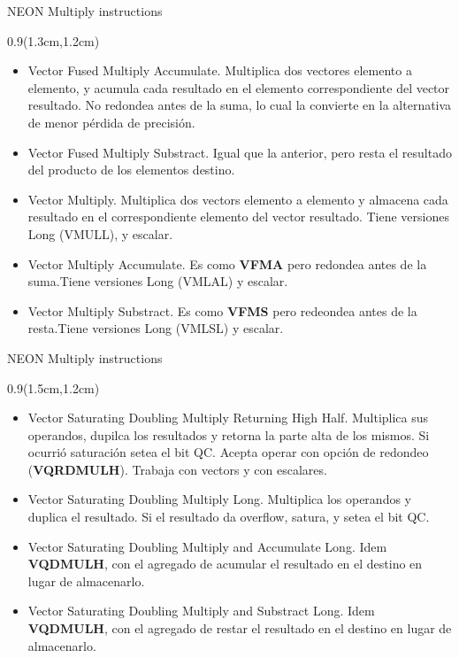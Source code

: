 \begin{frame}{NEON Multiply instructions}
 \begin{textblock*}{0.9\textwidth}(1.3cm,1.2cm)
  \begin{itemize}\justifying
   \item [VFMA] Vector Fused Multiply Accumulate. Multiplica dos vectores elemento a elemento, y acumula cada resultado en el elemento correspondiente del vector resultado. No redondea antes de la suma, lo cual la convierte en la alternativa de menor pérdida de precisión.
   \item [VFMS] Vector Fused Multiply Substract. Igual que la anterior, pero resta el resultado del producto de los elementos destino.
   \item [VMUL] Vector Multiply. Multiplica dos vectors elemento a elemento y almacena cada resultado en el correspondiente elemento del vector resultado. Tiene versiones Long ({\color{blue}VMULL}), y escalar.
   \item [VMLA] Vector Multiply Accumulate. Es como \textbf{VFMA} pero redondea antes de la suma.Tiene versiones Long ({\color{blue}VMLAL}) y escalar.
   \item [VMLS] Vector Multiply Substract. Es como \textbf{VFMS} pero redeondea antes de la resta.Tiene versiones Long ({\color{blue}VMLSL}) y escalar.
  \end{itemize}
 \end{textblock*}
\end{frame}

\begin{frame}{NEON Multiply instructions}
 \begin{textblock*}{0.9\textwidth}(1.5cm,1.2cm)
  \begin{itemize}\justifying
   \item [VQDMULH] Vector Saturating Doubling Multiply Returning High Half. Multiplica sus operandos, dupilca los resultados y retorna la parte alta de los mismos. Si ocurrió saturación setea el bit QC. Acepta operar con opción de redondeo (\textbf{VQRDMULH}). Trabaja con vectors y con escalares.
   \item [VQDMULL] Vector Saturating Doubling Multiply Long. Multiplica los operandos y duplica el resultado. Si el resultado da overflow, satura, y setea el bit QC. 
   \item [VQDMLAL] Vector Saturating Doubling Multiply and Accumulate Long. Idem \textbf{VQDMULH}, con el agregado de acumular el  resultado en el destino en lugar de almacenarlo.
   \item [VQDMLSL] Vector Saturating Doubling Multiply and Substract Long. Idem \textbf{VQDMULH}, con el agregado de restar el  resultado en el destino en lugar de almacenarlo.
  \end{itemize}
 \end{textblock*}
\end{frame}

